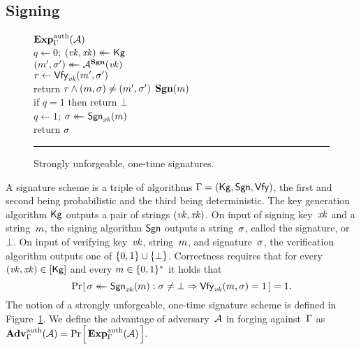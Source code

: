 \subsection{Signing}
\begin{figure}[t]
  {
    \underline{$\Exp{\auth}_\sigscheme(\advA)$}\\[2pt]
      $q \gets 0$; $(\mathit{vk}, \mathit{xk}) \mathrel{\leftarrow\mkern-14mu\leftarrow} \mathsf{Kg}$\\
      $(m^\prime, \sigma^\prime) \mathrel{\leftarrow\mkern-14mu\leftarrow} \mathcal{A}^{\mathbf{Sgn}}(\mathit{vk})$\\
      $r \gets \mathsf{Vfy}_{\mathit{vk}}(m^\prime, \sigma^\prime)$\\
      return $r \wedge (m, \sigma) \ne (m^\prime, \sigma^\prime)$
  }
  {
    \underline{$\mathbf{Sgn}(m)$}\\[2pt]
      if $q = 1$ then return $\bot$\\
      $q \gets 1$;
      $\sigma \mathrel{\leftarrow\mkern-14mu\leftarrow} \mathsf{Sgn}_{\mathit{xk}}(m)$\\
      return $\sigma$
  }
  \caption{Strongly unforgeable, one-time signatures.}
  \label{fig-auth}
  \vspace{6pt}
  \hrule
\end{figure}
A signature scheme is a triple of algorithms $\mathrm{\Gamma} =
(\mathsf{Kg},\mathsf{Sgn},\mathsf{Vfy})$, the first and second being probabilistic and the
third being deterministic.
%
The key generation algorithm $\mathsf{Kg}$ outputs a pair of strings $(\mathit{vk}, \mathit{xk})$.
%
On input of signing key~$\mathit{xk}$ and a string~$m$, the signing algorithm
$\mathsf{Sgn}$ outputs a string~$\sigma$, called the signature, or~$\bot$.
%
On input of verifying key~$\mathit{vk}$, string~$m$, and signature~$\sigma$, the
verification algorithm outputs one of $\{0,1\} \cup \{\bot\}$.
%
Correctness requires that for every $(\mathit{vk},\mathit{xk}) \in [\mathsf{Kg}]$ and every $m
\in \{0,1\}^*$ it holds that
\[
  {\Pr\hspace{-1pt}\left[\,{ \sigma \mathrel{\leftarrow\mkern-14mu\leftarrow} \mathsf{Sgn}_{\mathit{xk}}(m) : \sigma \ne \bot \Rightarrow \mathsf{Vfy}_{\mathit{vk}}(
  m, \sigma) =1 }\,\right]} = 1.
\]
The notion of a strongly unforgeable, one-time signature scheme is defined in
Figure~\ref{fig-auth}. We define the advantage of adversary~$\mathcal{A}$ in forging
against~$\mathrm{\Gamma}$ as
$
  \Adv{\auth}_\sigscheme(\advA) = \prob{\Exp{\auth}_\sigscheme(\advA)}.
$


